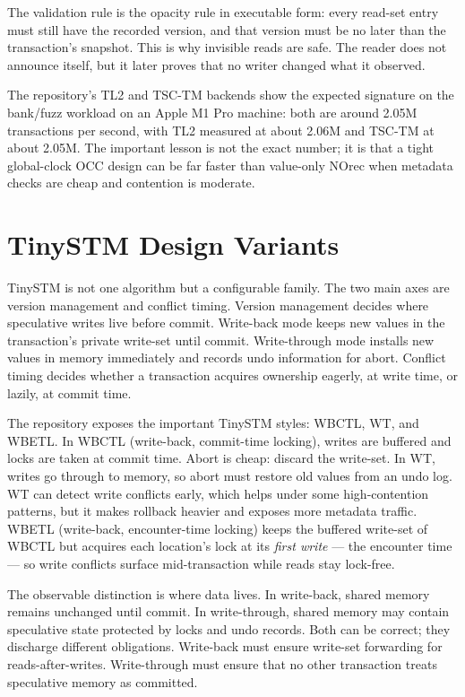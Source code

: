 The validation rule is the opacity rule in executable form: every read-set entry must still have the recorded version, and that version must be no later than the transaction's snapshot. This is why invisible reads are safe. The reader does not announce itself, but it later proves that no writer changed what it observed.

The repository's TL2 and TSC-TM backends show the expected signature on the bank/fuzz workload on an Apple M1 Pro machine: both are around 2.05M transactions per second, with TL2 measured at about 2.06M and TSC-TM at about 2.05M. The important lesson is not the exact number; it is that a tight global-clock OCC design can be far faster than value-only NOrec when metadata checks are cheap and contention is moderate.

\section{TinySTM Design Variants}

TinySTM is not one algorithm but a configurable family. The two main axes are version management and conflict timing. Version management decides where speculative writes live before commit. Write-back mode keeps new values in the transaction's private write-set until commit. Write-through mode installs new values in memory immediately and records undo information for abort. Conflict timing decides whether a transaction acquires ownership eagerly, at write time, or lazily, at commit time.

The repository exposes the important TinySTM styles: WBCTL, WT, and WBETL. In WBCTL (write-back, commit-time locking), writes are buffered and locks are taken at commit time. Abort is cheap: discard the write-set. In WT, writes go through to memory, so abort must restore old values from an undo log. WT can detect write conflicts early, which helps under some high-contention patterns, but it makes rollback heavier and exposes more metadata traffic. WBETL (write-back, encounter-time locking) keeps the buffered write-set of WBCTL but acquires each location's lock at its \emph{first write} --- the encounter time --- so write conflicts surface mid-transaction while reads stay lock-free.

The observable distinction is where data lives. In write-back, shared memory remains unchanged until commit. In write-through, shared memory may contain speculative state protected by locks and undo records. Both can be correct; they discharge different obligations. Write-back must ensure write-set forwarding for reads-after-writes. Write-through must ensure that no other transaction treats speculative memory as committed.

